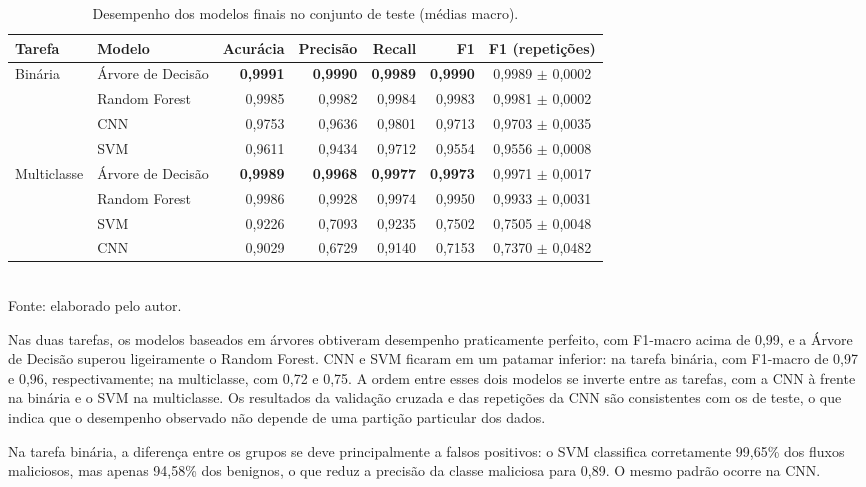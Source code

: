 \begin{table}[htbp]
\centering
\caption{Desempenho dos modelos finais no conjunto de teste (médias macro).}
\label{tab:resultados-principais}
\small
\setlength{\tabcolsep}{4pt}
\begin{tabular}{llrrrrc}
\toprule
\textbf{Tarefa} & \textbf{Modelo} & \textbf{Acurácia} & \textbf{Precisão} & \textbf{Recall} & \textbf{F1} & \textbf{F1 (repetições)} \\
\midrule
\multirow{4}{*}{Binária}
 & Árvore de Decisão & \textbf{0,9991} & \textbf{0,9990} & \textbf{0,9989} & \textbf{0,9990} & 0,9989 $\pm$ 0,0002 \\
 & Random Forest     & 0,9985 & 0,9982 & 0,9984 & 0,9983 & 0,9981 $\pm$ 0,0002 \\
 & CNN               & 0,9753 & 0,9636 & 0,9801 & 0,9713 & 0,9703 $\pm$ 0,0035 \\
 & SVM               & 0,9611 & 0,9434 & 0,9712 & 0,9554 & 0,9556 $\pm$ 0,0008 \\
\midrule
\multirow{4}{*}{Multiclasse}
 & Árvore de Decisão & \textbf{0,9989} & \textbf{0,9968} & \textbf{0,9977} & \textbf{0,9973} & 0,9971 $\pm$ 0,0017 \\
 & Random Forest     & 0,9986 & 0,9928 & 0,9974 & 0,9950 & 0,9933 $\pm$ 0,0031 \\
 & SVM               & 0,9226 & 0,7093 & 0,9235 & 0,7502 & 0,7505 $\pm$ 0,0048 \\
 & CNN               & 0,9029 & 0,6729 & 0,9140 & 0,7153 & 0,7370 $\pm$ 0,0482 \\
\bottomrule
\end{tabular}
\\[2pt]
\small{Fonte: elaborado pelo autor.}
\end{table}

Nas duas tarefas, os modelos baseados em árvores obtiveram desempenho praticamente perfeito, com F1-macro acima de 0,99, e a Árvore de Decisão superou ligeiramente o Random Forest. CNN e SVM ficaram em um patamar inferior: na tarefa binária, com F1-macro de 0,97 e 0,96, respectivamente; na multiclasse, com 0,72 e 0,75. A ordem entre esses dois modelos se inverte entre as tarefas, com a CNN à frente na binária e o SVM na multiclasse. Os resultados da validação cruzada e das repetições da CNN são consistentes com os de teste, o que indica que o desempenho observado não depende de uma partição particular dos dados.

Na tarefa binária, a diferença entre os grupos se deve principalmente a falsos positivos: o SVM classifica corretamente 99,65\% dos fluxos maliciosos, mas apenas 94,58\% dos benignos, o que reduz a precisão da classe maliciosa para 0,89. O mesmo padrão ocorre na CNN.

